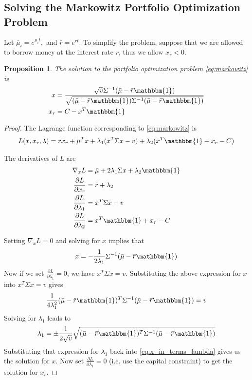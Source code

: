 \documentclass{amsart}
\newtheorem{prop}[thm]{Proposition}
\theoremstyle{definition}
\theoremstyle{remark}
\begin{document}
\subsection{Solving the Markowitz Portfolio Optimization Problem}
Let $\bar{\mu}_i = e^{\mu_i t},$ and $\bar{r} = e^{rt}$. To simplify the problem, suppose that we are allowed to borrow money at the interest rate $r$, thus we allow $x_r < 0$.

\begin{prop}
The solution to the portfolio optimization problem \eqref{eq:markowitz} is
\begin{align*}
x &= \frac{\sqrt{v} \Sigma^{-1} (\bar{\mu} - \bar{r}\mathbbm{1})}{\sqrt{(\bar{\mu} - \bar{r}\mathbbm{1}) \Sigma^{-1} (\bar{\mu} - \bar{r}\mathbbm{1})}}\\
x_r &= C - x^T \mathbbm{1}
\end{align*}
\end{prop}
\begin{proof}
The Lagrange function corresponding to \eqref{eq:markowitz} is
\begin{equation*}
L(x,x_r,\lambda) = \bar{r} x_r + \bar{\mu}^T x + \lambda_1(x^T \Sigma x - v) + \lambda_2(x^T \mathbbm{1} + x_r - C)
\end{equation*}

The derivatives of $L$ are
\begin{align*}
\nabla_x L &= \bar{\mu} + 2\lambda_1\Sigma x + \lambda_2 \mathbbm{1}\\
\frac{\partial L}{\partial x_r} &= \bar{r}+\lambda_2\\
\frac{\partial L}{\partial \lambda_1} &= x^T \Sigma x - v\\
\frac{\partial L}{\partial \lambda_2} &= x^T \mathbbm{1} + x_r - C
\end{align*}

Setting $\nabla_x L = 0$ and solving for $x$ implies that
\begin{equation}\label{eq:x_in_terms_lambda}
x = -\frac{1}{2\lambda_1} \Sigma^{-1}(\bar{\mu} - \bar{r}\mathbbm{1})
\end{equation}
Now if we set $\frac{\partial L}{\partial \lambda_1} = 0$, we have $x^T\Sigma x = v$. Substituting the above expression for $x$ into $x^T\Sigma x = v$ gives
\begin{equation*}
\frac{1}{4\lambda_1^2} (\bar{\mu}-\bar{r}\mathbbm{1})^T\Sigma^{-1} (\bar{\mu}-\bar{r}\mathbbm{1}) = v
\end{equation*}
Solving for $\lambda_1$ leads to
\begin{equation*}
\lambda_1 = \pm \frac{1}{2\sqrt{v}} \sqrt{(\bar{\mu}-\bar{r}\mathbbm{1})^T\Sigma^{-1} (\bar{\mu}-\bar{r}\mathbbm{1})}
\end{equation*}
Substituting that expression for $\lambda_1$ back into \eqref{eq:x_in_terms_lambda} gives us the solution for $x$. Now set $\frac{\partial L}{\partial \lambda_1} = 0$ (i.e. use the capital constraint) to get the solution for $x_r$.
\end{proof}
\end{document}
